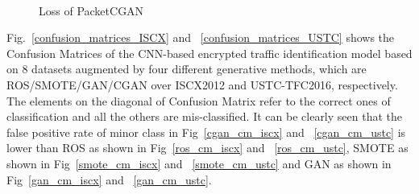 \documentclass[conference]{IEEEtran}
\begin{document}
\begin{figure}[htbp]
	\centering
	\\
	\centering
	
	\caption{Loss of PacketCGAN}
	\label{cgan_loss}
\end{figure}


Fig.~\ref{confusion_matrices_ISCX} and ~\ref{confusion_matrices_USTC} shows the Confusion Matrices of the CNN-based encrypted traffic identification model based on 8 datasets augmented by four different generative methods, which are ROS/SMOTE/GAN/CGAN over ISCX2012 and USTC-TFC2016, respectively. The elements on the diagonal of Confusion Matrix refer to the correct ones of classification and all the others are mis-classified. It can be clearly seen that the false positive rate of minor class in Fig~\ref{cgan_cm_iscx} and ~\ref{cgan_cm_ustc} is lower than ROS as shown in  Fig~\ref{ros_cm_iscx} and ~\ref{ros_cm_ustc}, SMOTE as shown in  Fig~\ref{smote_cm_iscx} and ~\ref{smote_cm_ustc} and GAN as shown in  Fig~\ref{gan_cm_iscx} and ~\ref{gan_cm_ustc}.
\end{document}
